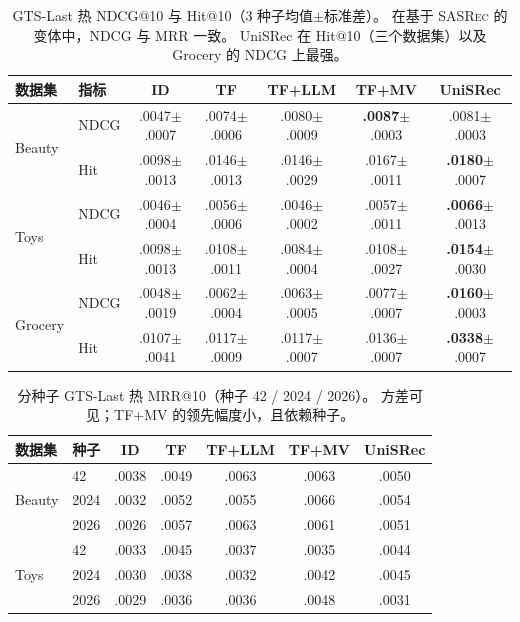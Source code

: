 \documentclass[sigconf,natbib=true,anonymous]{acmart}
\newcommand{\tfmv}{\textsc{TF+MV}\xspace}
\newcommand{\base}{\textsc{SASRec}\xspace}
\begin{document}
\begin{table}[t]
\centering
\caption{%
GTS-Last 热 NDCG@10 与 Hit@10（3 种子均值$\pm$标准差）。
在基于 \base 的变体中，NDCG 与 MRR 一致。
UniSRec 在 Hit@10（三个数据集）以及 Grocery 的 NDCG 上最强。%
}
\label{tab:ndcg_hit}
\small
\setlength{\tabcolsep}{2.5pt}
\begin{tabular}{@{}llccccc@{}}
\toprule
数据集 & 指标 & ID & TF & TF+LLM & TF+MV & UniSRec \\
\midrule
\multirow{2}{*}{Beauty}
 & NDCG & .0047\tiny{$\pm$.0007} & .0074\tiny{$\pm$.0006} & .0080\tiny{$\pm$.0009} & \textbf{.0087}\tiny{$\pm$.0003} & .0081\tiny{$\pm$.0003} \\
 & Hit  & .0098\tiny{$\pm$.0013} & .0146\tiny{$\pm$.0013} & .0146\tiny{$\pm$.0029} & .0167\tiny{$\pm$.0011} & \textbf{.0180}\tiny{$\pm$.0007} \\
\midrule
\multirow{2}{*}{Toys}
 & NDCG & .0046\tiny{$\pm$.0004} & .0056\tiny{$\pm$.0006} & .0046\tiny{$\pm$.0002} & .0057\tiny{$\pm$.0011} & \textbf{.0066}\tiny{$\pm$.0013} \\
 & Hit  & .0098\tiny{$\pm$.0013} & .0108\tiny{$\pm$.0011} & .0084\tiny{$\pm$.0004} & .0108\tiny{$\pm$.0027} & \textbf{.0154}\tiny{$\pm$.0030} \\
\midrule
\multirow{2}{*}{Grocery}
 & NDCG & .0048\tiny{$\pm$.0019} & .0062\tiny{$\pm$.0004} & .0063\tiny{$\pm$.0005} & .0077\tiny{$\pm$.0007} & \textbf{.0160}\tiny{$\pm$.0003} \\
 & Hit  & .0107\tiny{$\pm$.0041} & .0117\tiny{$\pm$.0009} & .0117\tiny{$\pm$.0007} & .0136\tiny{$\pm$.0007} & \textbf{.0338}\tiny{$\pm$.0007} \\
\bottomrule
\end{tabular}
\end{table}

\begin{table}[t]
\centering
\caption{%
分种子 GTS-Last 热 MRR@10（种子 42 / 2024 / 2026）。
方差可见；\tfmv 的领先幅度小，且依赖种子。%
}
\label{tab:perseed}
\small
\setlength{\tabcolsep}{3pt}
\begin{tabular}{@{}llccccc@{}}
\toprule
数据集 & 种子 & ID & TF & TF+LLM & TF+MV & UniSRec \\
\midrule
\multirow{3}{*}{Beauty}
 & 42    & .0038 & .0049 & .0063 & .0063 & .0050 \\
 & 2024  & .0032 & .0052 & .0055 & .0066 & .0054 \\
 & 2026  & .0026 & .0057 & .0063 & .0061 & .0051 \\
\midrule
\multirow{3}{*}{Toys}
 & 42    & .0033 & .0045 & .0037 & .0035 & .0044 \\
 & 2024  & .0030 & .0038 & .0032 & .0042 & .0045 \\
 & 2026  & .0029 & .0036 & .0036 & .0048 & .0031 \\
\bottomrule
\end{tabular}
\end{table}
\end{document}
